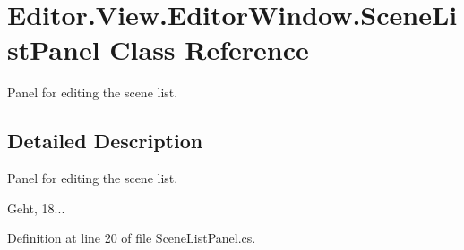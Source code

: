 \section{Editor.\-View.\-Editor\-Window.\-Scene\-List\-Panel Class Reference}
\label{class_editor_1_1_view_1_1_editor_window_1_1_scene_list_panel}


Panel for editing the scene list.  




\subsection{Detailed Description}
Panel for editing the scene list. 

Geht, 18... 

Definition at line 20 of file Scene\-List\-Panel.\-cs.

